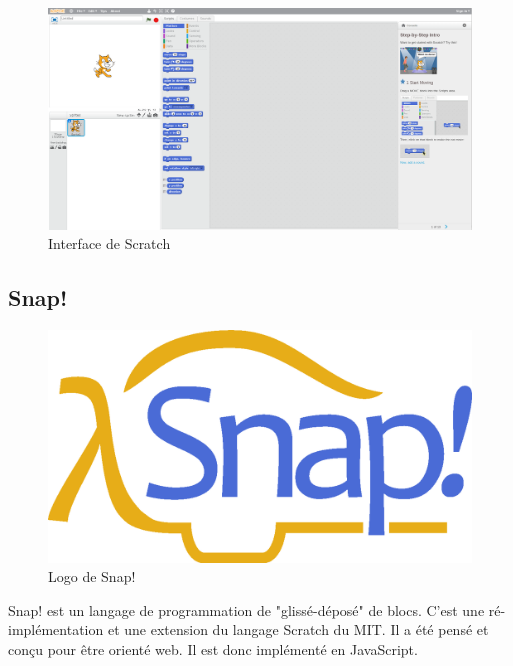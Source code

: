 \begin{figure}
  \begin{center}
    \includegraphics[width=\textwidth]{content/5-related_work/images/scratch-printscreen}
    \caption{Interface de Scratch}
    \label{fig:scratch-printscreen}
  \end{center}
\end{figure}

\subsection{Snap!}

\begin{figure}[!ht]
  \begin{center}
    \includegraphics[scale=0.07]{content/5-related_work/images/snap}
    \caption{Logo de Snap!}
    \label{fig:snap}
  \end{center}
\end{figure}

Snap! \cite{snap} est un langage de programmation de "glissé-déposé" de \glspl{bloc}. C'est une ré-implémentation et une extension du langage Scratch du MIT. Il a été pensé et conçu pour être orienté web. Il est donc implémenté en JavaScript.\\

